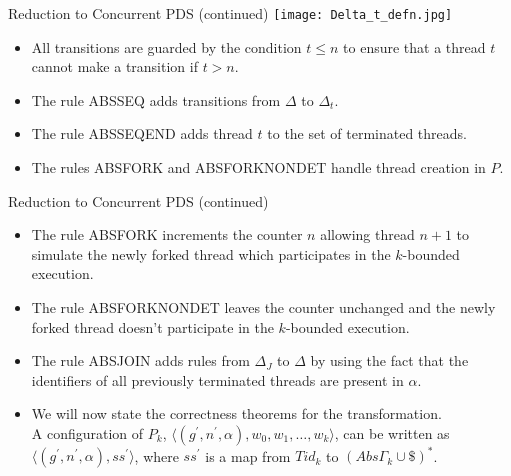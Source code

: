 \documentclass[10pt,notheorems]{beamer}
\theoremstyle{plain} %
\begin{document}
\begin{frame}{Reduction to Concurrent PDS (continued)}
    \texttt{[image: Delta\_t\_defn.jpg]}
    \begin{itemize}
        \item All transitions are guarded by the condition $t\leq n$ to ensure that a thread $t$ cannot
        make a transition if $t>n$.
        \item The rule ABSSEQ adds transitions from $\Delta$ to $\Delta_t$. 
        \item The rule ABSSEQEND adds thread $t$ to the set of terminated threads. 
        \item The rules ABSFORK and ABSFORKNONDET handle thread creation in $P$.  
    \end{itemize}
\end{frame}
\begin{frame}{Reduction to Concurrent PDS (continued)}
    \begin{itemize}
        \item The rule ABSFORK increments the counter $n$ allowing thread $n+1$ to simulate the newly
        forked thread which participates in the $k$-bounded execution.
        \item The rule ABSFORKNONDET leaves the counter unchanged and the newly forked thread doesn't participate 
        in the $k$-bounded execution.
        \item The rule ABSJOIN adds rules from $\Delta_J$ to $\Delta$ by using the fact that the identifiers
        of all previously terminated threads are present in $\alpha$.
        \item We will now state the correctness theorems for the transformation.\\ A configuration of 
        $P_k$, $\langle(g^{\prime},n^{\prime},\alpha),w_0,w_1,\dots,w_k\rangle$, can be written as 
        $\langle(g^{\prime},n^{\prime},\alpha),ss^{\prime}\rangle$, where $ss^{\prime}$ is a map from $Tid_k$ to $(Abs\Gamma_k\cup \$)^*$. 
    \end{itemize}
\end{frame}
\end{document}
